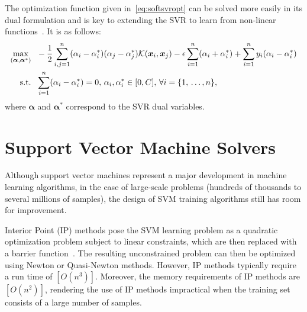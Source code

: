 \documentclass[reqno]{vcuthesis}
\newcommand{\set}[1]{{\left\{#1\right\}}}
\numberwithin{equation}{chapter}
\begin{document}
The optimization function given in~\ref{eq:softsvropt} can be solved more easily in its dual formulation and is key to extending the SVR to learn from non-linear functions~\cite{Schoelkopf2002}. It is as follows:
\begin{equation}
\label{eq:dualSVR}
\centering
\begin{aligned}
\max\limits_{(\bm \alpha, \bm \alpha^*)} & {\,\,\,\,} -\frac{1}{2} \sum_{i,j = 1}^n (\alpha_i - \alpha^*_i)(\alpha_j - \alpha^*_j)\mathcal{K}(\bm x_i, \bm x_j)  - \epsilon \sum_{i=1}^n (\alpha_i + \alpha^*_i) + \sum_{i=1}^n y_i (\alpha_i - \alpha^*_i) \\
 \text{s.t.} & {\,\,\,\,} \sum_{i=1}^n (\alpha_i - \alpha^*_i) = 0,\, \alpha_i, \alpha^*_i \in [0, C],\, \forall i = \set{1,\,\ldots,n},
 \end{aligned}
\end{equation}
where $\bm \alpha$ and $\bm \alpha^*$ correspond to the SVR dual variables.  

\section{Support Vector Machine Solvers}
Although support vector machines represent a major development in machine learning algorithms, in the case of large-scale problems (hundreds of thousands to several millions of samples), the design of SVM training algorithms still has room for improvement. 


Interior Point (IP) methods pose the SVM learning problem as a quadratic optimization problem subject to linear constraints, which are then replaced with a barrier function~\cite{Boyd2004}. The resulting unconstrained problem can then be optimized using Newton or Quasi-Newton methods. However, IP methods typically require a run time of $[O(n^3)]$. Moreover, the memory requirements of IP methods are $[O(n^2)]$, rendering the use of IP methods impractical when the training set consists of a large number of samples. 
\end{document}
